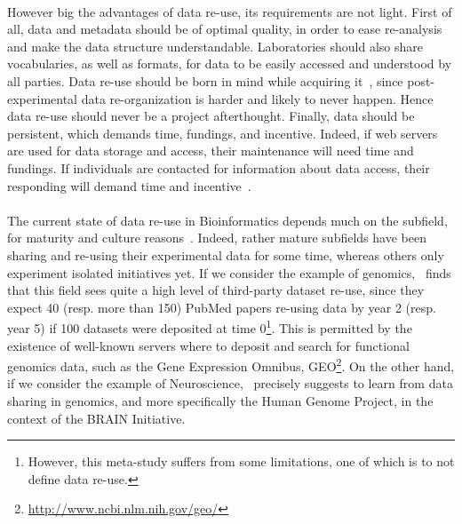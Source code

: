 \paragraph*{}
However big the advantages of data re-use, its requirements are not
light. First of all, data and metadata should be of optimal quality,
in order to ease re-analysis and make the data structure
understandable. Laboratories should also share vocabularies, as well as
formats, for data to be easily accessed and understood by all
parties. Data re-use should be born in mind while acquiring
it~\cite{pmid23047157}, since post-experimental data re-organization
is harder and likely to never happen. Hence data re-use should never
be a project afterthought. Finally, data should be persistent, which
demands time, fundings, and incentive. Indeed, if web servers are used
for data storage and access, their maintenance will need time and
fundings. If individuals are contacted for information about data
access, their responding will demand time and
incentive~\cite{pmid18636105}. 

\paragraph*{} The current state of data re-use in Bioinformatics depends much on the subfield, for maturity and culture reasons~\cite{pmid24904347}. Indeed, rather mature subfields have been sharing and re-using their experimental data for some time, whereas others only experiment isolated initiatives yet. If we consider the example of genomics,~\cite{pmid24109559} finds that this field sees quite a high level of third-party dataset re-use, since they expect 40 (resp. more than 150) PubMed papers re-using data by year 2 (resp. year 5) if 100 datasets were deposited at time 0\footnote{However, this meta-study suffers from some limitations, one of which is to not define data re-use.}. This is permitted by the existence of well-known servers where to deposit and search for functional genomics data, such as the Gene Expression Omnibus,  GEO\footnote{\href{http://www.ncbi.nlm.nih.gov/geo/}{http://www.ncbi.nlm.nih.gov/geo/}}. On the other hand, if we consider the example of Neuroscience,~\cite{pmid24904347} precisely suggests to learn from data sharing in genomics, and more specifically the Human Genome Project, in the context of the BRAIN Initiative. %

